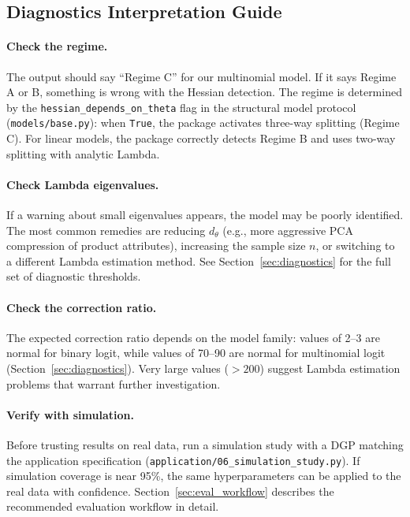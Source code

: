 \subsection{Diagnostics Interpretation Guide}

\paragraph{Check the regime.} The output should say ``Regime C'' for our multinomial model. If it says Regime A or B, something is wrong with the Hessian detection. The regime is determined by the \texttt{hessian\_depends\_on\_theta} flag in the structural model protocol (\texttt{models/base.py}): when \texttt{True}, the package activates three-way splitting (Regime C). For linear models, the package correctly detects Regime B and uses two-way splitting with analytic Lambda.

\paragraph{Check Lambda eigenvalues.} If a warning about small eigenvalues appears, the model may be poorly identified. The most common remedies are reducing $d_\theta$ (e.g., more aggressive PCA compression of product attributes), increasing the sample size $n$, or switching to a different Lambda estimation method. See Section~\ref{sec:diagnostics} for the full set of diagnostic thresholds.

\paragraph{Check the correction ratio.} The expected correction ratio depends on the model family: values of 2--3 are normal for binary logit, while values of 70--90 are normal for multinomial logit (Section~\ref{sec:diagnostics}). Very large values ($> 200$) suggest Lambda estimation problems that warrant further investigation.

\paragraph{Verify with simulation.} Before trusting results on real data, run a simulation study with a DGP matching the application specification (\texttt{application/06\_simulation\_study.py}). If simulation coverage is near 95\%, the same hyperparameters can be applied to the real data with confidence. Section~\ref{sec:eval_workflow} describes the recommended evaluation workflow in detail.

